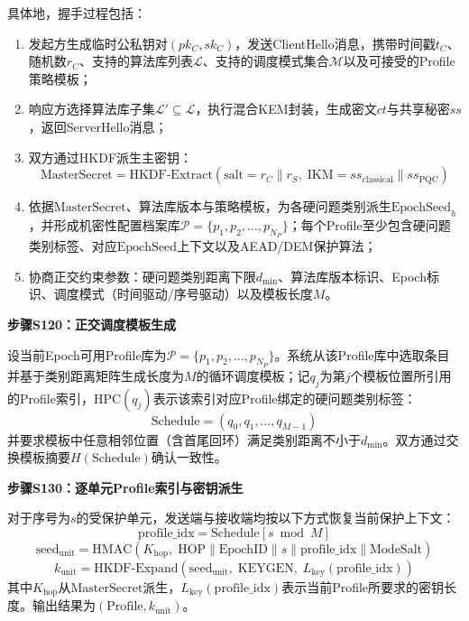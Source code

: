 ﻿\documentclass[12pt,a4paper]{article}
\begin{document}
具体地，握手过程包括：
\begin{enumerate}[label=S110.\arabic*]
    \item 发起方生成临时公私钥对$(pk_C, sk_C)$，发送ClientHello消息，携带时间戳$t_C$、随机数$r_C$、支持的算法库列表$\mathcal{L}$、支持的调度模式集合$\mathcal{M}$以及可接受的Profile策略模板；
    \item 响应方选择算法库子集$\mathcal{L}' \subseteq \mathcal{L}$，执行混合KEM封装，生成密文$ct$与共享秘密$ss$，返回ServerHello消息；
    \item 双方通过HKDF派生主密钥：
    \begin{equation}
        \text{MasterSecret} = \text{HKDF-Extract}(\text{salt}=r_C \| r_S,\; \text{IKM}=ss_{\text{classical}} \| ss_{\text{PQC}})
    \end{equation}
    \item 依据$\text{MasterSecret}$、算法库版本与策略模板，为各硬问题类别派生$\text{EpochSeed}_h$，并形成机密性配置档案库$\mathcal{P}=\{p_1,p_2,\ldots,p_{N_P}\}$；每个Profile至少包含硬问题类别标签、对应$\text{EpochSeed}$上下文以及AEAD/DEM保护算法；
    \item 协商正交约束参数：硬问题类别距离下限$d_{\min}$、算法库版本标识、Epoch标识、调度模式（时间驱动/序号驱动）以及模板长度$M$。
\end{enumerate}

\textbf{步骤S120：正交调度模板生成}

设当前Epoch可用Profile库为$\mathcal{P}=\{p_1,p_2,\ldots,p_{N_P}\}$。系统从该Profile库中选取条目并基于类别距离矩阵生成长度为$M$的循环调度模板；记$q_j$为第$j$个模板位置所引用的Profile索引，$\mathrm{HPC}(q_j)$表示该索引对应Profile绑定的硬问题类别标签：
\begin{equation}
    \text{Schedule} = (q_0, q_1, \ldots, q_{M-1})
\end{equation}
并要求模板中任意相邻位置（含首尾回环）满足类别距离不小于$d_{\min}$。双方通过交换模板摘要$H(\text{Schedule})$确认一致性。

\textbf{步骤S130：逐单元Profile索引与密钥派生}

对于序号为$s$的受保护单元，发送端与接收端均按以下方式恢复当前保护上下文：
\begin{equation}
    \text{profile\_idx} = \text{Schedule}[s \bmod M]
\end{equation}
\begin{equation}\label{eq:derive}
    \text{seed}_{\text{unit}} = \text{HMAC}(K_{\text{hop}},\; \text{HOP} \| \text{EpochID} \| s \| \text{profile\_idx} \| \text{ModeSalt})
\end{equation}
\begin{equation}\label{eq:key}
    k_{\text{unit}} = \text{HKDF-Expand}(\text{seed}_{\text{unit}},\; \text{KEYGEN},\; L_{\text{key}}(\text{profile\_idx}))
\end{equation}
其中$K_{\text{hop}}$从$\text{MasterSecret}$派生，$L_{\text{key}}(\text{profile\_idx})$表示当前Profile所要求的密钥长度。输出结果为$(\text{Profile}, k_{\text{unit}})$。
\end{document}
